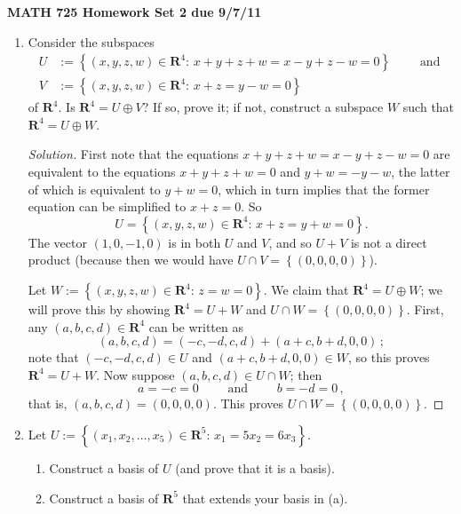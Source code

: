 \documentclass[11pt]{amsart}
\begin{document}
\setlength{\parindent}{0pt}
\setlength{\parskip}{0.4cm}
\thispagestyle{empty} 
\def\s{\mathbf{s}}
\def\t{\mathbf{t}}
\def\u{\mathbf{u}}
\def\v{\mathbf{v}}
\def\C{\mathbf{C}}
\def\F{\mathbf{F}}
\def\R{\mathbf{R}}
\def\Z{\mathbf{Z}}
\def\P{\mathcal{P}}
\newcommand\spn{\operatorname{span}}

\begin{center} {\bf MATH 725 \qquad \qquad Homework Set 2 \qquad \qquad due 9/7/11} \end{center} 

\begin{enumerate}[(1)]

\item Consider the subspaces
\begin{align*}
  U &:= \left\{ (x,y,z,w) \in \R^4 : \, x+y+z+w=x-y+z-w=0 \right\} \qquad \text{ and } \\
  V &:= \left\{ (x,y,z,w) \in \R^4 : \, x+z=y-w=0 \right\}
\end{align*}
of $\R^4$.
Is $\R^4 = U \oplus V$? If so, prove it; if not, construct a subspace $W$ such that $\R^4 = U \oplus W$.

\begin{proof}[Solution]
First note that the equations $x+y+z+w=x-y+z-w=0$ are equivalent to the equations $x+y+z+w=0$ and $y+w=-y-w$, the latter of which is equivalent to $y+w=0$, which in turn implies that the former equation can be simplified to $x+z = 0$. So
\[
  U = \left\{ (x,y,z,w) \in \R^4 : \, x+z = y+w = 0 \right\} .
\]
The vector $(1,0,-1,0)$ is in both $U$ and $V$, and so $U+V$ is not a direct product (because then we would have $U \cap V = \left\{ (0,0,0,0) \right\}$).

Let $W := \left\{ (x,y,z,w) \in \R^4 : \, z = w = 0 \right\}$. We claim that $\R^4 = U \oplus W$; we will prove this by showing $\R^4 = U + W$ and $U \cap W = \left\{ (0,0,0,0) \right\}$.
First, any $(a,b,c,d) \in \R^4$ can be written as
\[
  (a,b,c,d) = (-c,-d,c,d) + (a+c,b+d,0,0) \, ;
\]
note that $(-c,-d,c,d) \in U$ and $(a+c,b+d,0,0) \in W$, so this proves $\R^4 = U + W$.
Now suppose $(a,b,c,d) \in U \cap W$; then
\[
  a = -c = 0
  \qquad \text{ and } \qquad
  b = -d = 0 \, ,
\]
that is, $(a,b,c,d) = (0,0,0,0)$. This proves $U \cap W = \left\{ (0,0,0,0) \right\}$.
\end{proof}

\item Let $U := \left\{ \left( x_1, x_2, \dots, x_5 \right) \in \R^5 : \, x_1 = 5 x_2 = 6 x_3 \right\}$.
  \begin{enumerate}
  \item Construct a basis of $U$ (and prove that it is a basis).
  \item Construct a basis of $\R^5$ that extends your basis in (a).
  \end{enumerate}


\end{enumerate}
\end{document}
